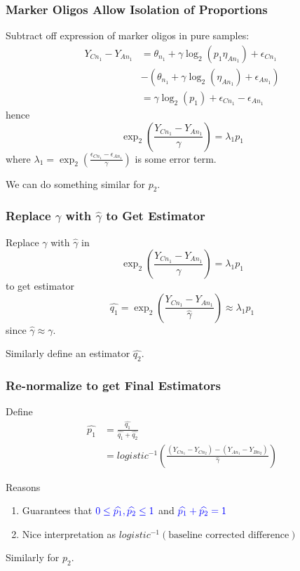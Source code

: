 \documentclass{beamer}
\begin{document}
\begin{frame}
  \frametitle{Marker Oligos Allow Isolation of Proportions}
Subtract off expression of marker oligos in pure samples:
  \[
  \begin{aligned}
    Y_{Cn_1} -Y_{An_1} &= \theta_{n_1} + \gamma\log_2\left(p_1\eta_{An_1}\right)+\epsilon_{Cn_1}\\
    &-\left(\theta_{n_1} + \gamma\log_2\left(\eta_{An_1}\right)+\epsilon_{An_1}\right)\\
    &= \gamma \log_2\left(p_1\right)+\epsilon_{Cn_1}-\epsilon_{An_1}
  \end{aligned}
  \]
  hence
{\color{blue}  \[
\exp_2\left(\frac{Y_{Cn_1} -Y_{An_1}}{\gamma}\right) = \lambda_{1}p_1
\]}
where $\lambda_{1} = \exp_2\left(\frac{\epsilon_{Cn_1}-\epsilon_{An_1}}{\gamma}\right)$ is some error term.\vspace{.25cm}

We can do something similar for $p_2$. 
\end{frame}

\begin{frame}
  \frametitle{Replace $\gamma$ with $\widehat{\gamma}$ to Get Estimator}
Replace $\gamma$ with $\widehat{\gamma}$ in 
  \[
\exp_2\left(\frac{Y_{Cn_1} -Y_{An_1}}{\gamma}\right) = \lambda_{1}p_1
\]
to get estimator 
{\color{blue}$$
\widehat{q_1} = \exp_2\left(\frac{Y_{Cn_1} -Y_{An_1}}{\widehat{\gamma}}\right)\approx\lambda_{1}p_1
$$}
since $\widehat{\gamma}\approx \gamma$.\vspace{.25cm}

Similarly define an estimator $\widehat{q_2}$.
\end{frame}

\begin{frame}
  \frametitle{Re-normalize to get Final Estimators}
  Define
\[
  \begin{aligned}
  \widehat{p_1}&=\frac{\widehat{q_1}}{\widehat{q_1}+\widehat{q_2}}\\
  &= logistic^{-1}\left(\frac{(Y_{Cn_1}-Y_{Cn_2}) - (Y_{An_1}-Y_{Bn_2})}{\widehat{\gamma}}\right)
  \end{aligned}
  \]
  
  Reasons
  \begin{enumerate}
  \item Guarantees that ${\color{blue} 0 \leq \widehat{p_1},\widehat{p_2}\leq 1}$ and ${\color{blue}\widehat{p_1}+\widehat{p_2}=1}$
    \item Nice interpretation as $logistic^{-1}(\text{baseline corrected difference})$
  \end{enumerate}\vspace{.25cm}

  Similarly for $p_2$. 

\end{frame}
\end{document}
